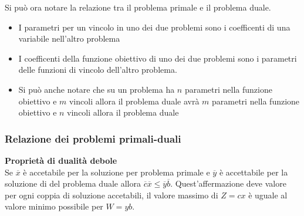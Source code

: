 \documentclass{article}
\begin{document}
Si può ora notare la relazione tra il problema primale e il problema duale.
\begin{itemize}
  \item I parametri per un vincolo in uno dei due problemi sono i coefficenti di una variabile nell'altro problema
  \item I coefficenti della funzione obiettivo di uno dei due problemi sono i parametri delle funzioni di vincolo dell'altro problema.
  \item Si può anche notare che su un problema ha $n$ parametri nella funzione obiettivo e $m$ vincoli allora il problema duale avrà $m$ parametri nella funzione obiettivo e $n$ vincoli allora il problema duale
\end{itemize}

\subsubsection{Relazione dei problemi primali-duali}
\textbf{Proprietà di dualità debole}\\
Se $\overline{x}$ è accetabile per la soluzione per problema primale e $\overline{y}$ è accettabile per la soluzione di del problema duale allora $\overline{c}\overline{x}\le \overline{y}\overline{b}$. Quest'affermazione deve valore per ogni coppia di soluzione accetabili, il valore massimo di $Z=cx$ è uguale al valore minimo possibile per $W=yb$.\\
\end{document}
